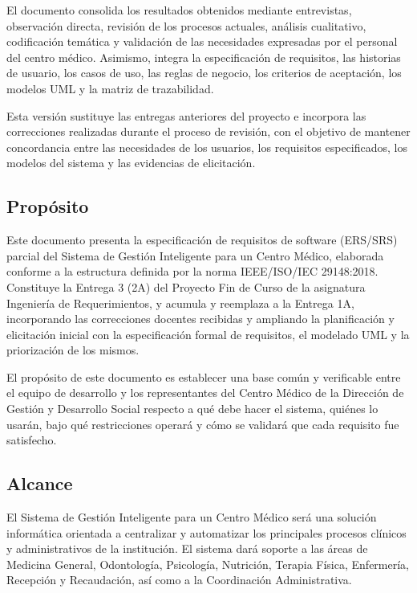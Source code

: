 \documentclass[11pt,a4paper]{article}
\begin{document}
	El documento consolida los resultados obtenidos mediante entrevistas,
	observación directa, revisión de los procesos actuales, análisis cualitativo,
	codificación temática y validación de las necesidades expresadas por el
	personal del centro médico. Asimismo, integra la especificación de requisitos,
	las historias de usuario, los casos de uso, las reglas de negocio, los criterios
	de aceptación, los modelos UML y la matriz de trazabilidad.
	
	Esta versión sustituye las entregas anteriores del proyecto e incorpora las
	correcciones realizadas durante el proceso de revisión, con el objetivo de
	mantener concordancia entre las necesidades de los usuarios, los requisitos
	especificados, los modelos del sistema y las evidencias de elicitación.
	
	\subsection{ Propósito}
	
	Este documento presenta la especificación de requisitos de software (ERS/SRS) parcial del Sistema de Gestión Inteligente para un Centro Médico, elaborada conforme a la estructura definida por la norma IEEE/ISO/IEC 29148:2018. Constituye la Entrega 3 (2A) del Proyecto Fin de Curso de la asignatura Ingeniería de Requerimientos, y acumula y reemplaza a la Entrega 1A, incorporando las correcciones docentes recibidas y ampliando la planificación y elicitación inicial con la especificación formal de requisitos, el modelado UML y la priorización de los mismos.
	
	El propósito de este documento es establecer una base común y verificable entre el equipo de desarrollo y los representantes del Centro Médico de la Dirección de Gestión y Desarrollo Social respecto a qué debe hacer el sistema, quiénes lo usarán, bajo qué restricciones operará y cómo se validará que cada requisito fue satisfecho.
	
	
	\subsection{ Alcance}
	
	El Sistema de Gestión Inteligente para un Centro Médico será una solución informática orientada a centralizar y automatizar los principales procesos clínicos y administrativos de la institución. El sistema dará soporte a las áreas de Medicina General, Odontología, Psicología, Nutrición, Terapia Física, Enfermería, Recepción y Recaudación, así como a la Coordinación Administrativa.
	
\end{document}
